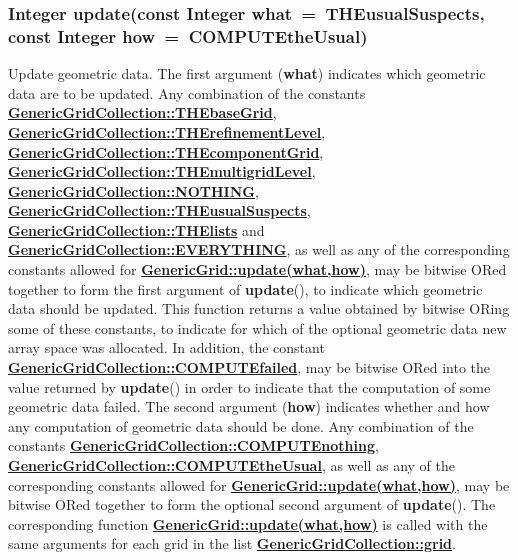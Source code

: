 \documentclass{article}
\begin{document}
  \subsubsection{Integer update(const Integer what~=~THEusualSuspects, const Integer how~=~COMPUTEtheUsual)}
  \label{GenericGridCollection::update(what,how)}
    Update geometric data.
    The first argument (\textbf{what}) indicates which geometric data are to be updated.  Any combination of the constants
    {\bf{}\hyperref{THEbaseGrid}{THEbaseGrid \rm(\S}{)}{GenericGridCollection::THEbaseGrid}},
    {\bf{}\hyperref{THErefinementLevel}{THErefinementLevel \rm(\S}{)}{GenericGridCollection::THErefinementLevel}},
    {\bf{}\hyperref{THEcomponentGrid}{THEcomponentGrid \rm(\S}{)}{GenericGridCollection::THEcomponentGrid}},
    {\bf{}\hyperref{THEmultigridLevel}{THEmultigridLevel \rm(\S}{)}{GenericGridCollection::THEmultigridLevel}},
    {\bf{}\hyperref{NOTHING}{NOTHING \rm(\S}{)}{GenericGridCollection::NOTHING}},
    {\bf{}\hyperref{THEusualSuspects}{THEusualSuspects \rm(\S}{)}{GenericGridCollection::THEusualSuspects}},
    {\bf{}\hyperref{THElists}{THElists \rm(\S}{)}{GenericGridCollection::THElists}} and
    {\bf{}\hyperref{EVERYTHING}{EVERYTHING \rm(\S}{)}{GenericGridCollection::EVERYTHING}},
    as well as any of the corresponding constants allowed for
    {\bf{}\hyperref{GenericGrid::update(what,how)}{GenericGrid::update(what,how) \rm(\S}{)}{GenericGrid::update(what,how)}},
    may be bitwise ORed together to form the first argument of \textbf{update}(),
    to indicate which geometric data should be updated.
    This function returns a value obtained by bitwise ORing some of these constants,
    to indicate for which of the optional geometric data new array space was allocated.
    In addition, the constant
    {\bf{}\hyperref{COMPUTEfailed}{COMPUTEfailed \rm(\S}{)}{GenericGridCollection::COMPUTEfailed}},
    may be bitwise ORed into the value returned by \textbf{update}() in order to indicate
    that the computation of some geometric data failed.  The second argument (\textbf{how})
    indicates whether and how any computation of geometric data should be done.
    Any combination of the constants
    {\bf{}\hyperref{COMPUTEnothing}{COMPUTEnothing \rm(\S}{)}{GenericGridCollection::COMPUTEnothing}},
    {\bf{}\hyperref{COMPUTEtheUsual}{COMPUTEtheUsual \rm(\S}{)}{GenericGridCollection::COMPUTEtheUsual}},
    as well as any of the corresponding constants allowed for
    {\bf{}\hyperref{GenericGrid::update(what,how)}{GenericGrid::update(what,how) \rm(\S}{)}{GenericGrid::update(what,how)}},
    may be bitwise ORed together to form the optional second argument of \textbf{update}().
    The corresponding function
    {\bf{}\hyperref{update(what,how)}{update(what,how) \rm(\S}{)}{GenericGrid::update(what,how)}}
    is called with the same arguments for each grid in the list
    {\bf{}\hyperref{grid}{grid \rm(\S}{)}{GenericGridCollection::grid}}.
\end{document}
